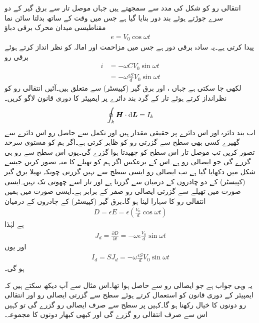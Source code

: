 انتقالی رو کو شکل  کی مدد سے سمجھتے ہیں جہاں موصل تار سے برق گیر   کے دو سرے جوڑتے ہوئے بند دور بنایا گیا ہے جس میں وقت کے ساتھ بدلتا سائن نما مقناطیسی میدان  محرک برقی دباؤ
\begin{align*}
e=V_0 \cos \omega t
\end{align*}
 پیدا کرتی ہے۔یہ سادہ برقی دور ہے جس میں مزاحمت اور امالہ کو نظر انداز کرتے ہوئے برقی رو
\begin{align*}
i&=-\omega C V_0 \sin \omega t\\
&=-\omega \frac{\epsilon S}{d} V_0 \sin \omega t
\end{align*}
لکھی جا سکتی ہے جہاں ،  اور  برق گیر (کپیسٹر) سے متعلق ہیں۔آئیں انتقالی رو کو نظرانداز کرتے ہوئے تار کے گرد بند دائرے   پر ایمپیئر کا دوری قانون لاگو کریں۔
\begin{align*}
\oint_k \kvec{H} \cdot \dif \kvec{L}=I_k
\end{align*}
اب بند دائرہ  اور اس دائرے پر  حقیقی مقدار ہیں اور تکمل سے حاصل رو  اس دائرے سے گھیرے کسی بھی سطح سے گزرتی رو کو ظاہر کرتی ہے۔اگر ہم  کو مستوی  سرحد تصور کریں تب موصل تار اس سطح کو چھیدتا ہوا گزرے گی۔یوں اس سطح سے  رو ہی گزرے گی جو ایصالی رو ہے۔اس کے برعکس اگر ہم  کو تھیلے کا منہ تصور کریں جیسے شکل میں دکھایا گیا ہے تب ایصالی رو ایسی سطح سے نہیں گزرتی چونکہ تھیلا برق گیر (کپیسٹر)  کے دو چادروں کے درمیان سے گزرتا ہے اور تار اسے چھوتی تک نہیں۔ایسی صورت میں تھیلے سے گزرتی ایصالی رو صفر کے برابر ہے۔ایسی صورت میں ہمیں انتقالی رو کا سہارا لینا ہو گا۔برق گیر (کپیسٹر)  کے چادروں کے درمیان
\begin{align*}
D=\epsilon E=\epsilon \left(\frac{V_0}{d} \cos \omega t \right)
\end{align*}
ہے لہٰذا
\begin{align*}
J_d=\frac{\partial D}{\partial t}=-\omega \epsilon \frac{V_0}{d} \sin \omega t
\end{align*}
اور یوں
\begin{align*}
I_d=S J_d =-\omega \frac{\epsilon  S}{d} V_0\sin \omega t 
\end{align*}
ہو گی۔

یہ وہی جواب ہے جو ایصالی رو سے حاصل ہوا تھا۔اس مثال سے آپ دیکھ سکتے ہیں کہ ایمپیئر کے دوری قانون کو استعمال کرتے ہوئے سطح سے  گزرتی ایصالی رو اور انتقالی رو دونوں کا خیال رکھنا ہو گا۔کہیں پر سطح سے صرف ایصالی رو گزرے گی تو کہیں اس سے صرف انتقالی رو گزرے گی اور کبھی کبھار دونوں کا مجموعہ۔

